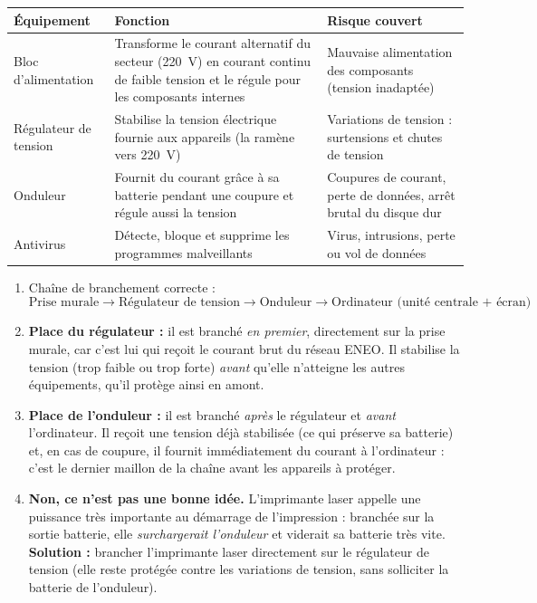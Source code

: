 \documentclass[11pt]{article}
\begin{document}
\begin{corrige}
\begin{center}
\begin{tabularx}{\linewidth}{|l|X|X|}
\hline
\rowcolor{popblueL} \textbf{Équipement} & \textbf{Fonction} & \textbf{Risque couvert} \\
\hline
Bloc d'alimentation & Transforme le courant alternatif du secteur (\SI{220}{V}) en courant continu de faible tension et le régule pour les composants internes & Mauvaise alimentation des composants (tension inadaptée) \\
\hline
Régulateur de tension & Stabilise la tension électrique fournie aux appareils (la ramène vers \SI{220}{V}) & Variations de tension : surtensions et chutes de tension \\
\hline
Onduleur & Fournit du courant grâce à sa batterie pendant une coupure et régule aussi la tension & Coupures de courant, perte de données, arrêt brutal du disque dur \\
\hline
Antivirus & Détecte, bloque et supprime les programmes malveillants & Virus, intrusions, perte ou vol de données \\
\hline
\end{tabularx}
\end{center}
\end{corrige}

\begin{corrige}
\begin{enumerate}
\item Chaîne de branchement correcte :
\[ \text{Prise murale} \rightarrow \text{Régulateur de tension} \rightarrow \text{Onduleur} \rightarrow \text{Ordinateur (unité centrale + écran)} \]
\item \textbf{Place du régulateur :} il est branché \emph{en premier}, directement sur la prise murale, car c'est lui qui reçoit le courant brut du réseau ENEO. Il stabilise la tension (trop faible ou trop forte) \emph{avant} qu'elle n'atteigne les autres équipements, qu'il protège ainsi en amont.
\item \textbf{Place de l'onduleur :} il est branché \emph{après} le régulateur et \emph{avant} l'ordinateur. Il reçoit une tension déjà stabilisée (ce qui préserve sa batterie) et, en cas de coupure, il fournit immédiatement du courant à l'ordinateur : c'est le dernier maillon de la chaîne avant les appareils à protéger.
\item \textbf{Non, ce n'est pas une bonne idée.} L'imprimante laser appelle une puissance très importante au démarrage de l'impression : branchée sur la sortie batterie, elle \emph{surchargerait l'onduleur} et viderait sa batterie très vite. \textbf{Solution :} brancher l'imprimante laser directement sur le régulateur de tension (elle reste protégée contre les variations de tension, sans solliciter la batterie de l'onduleur).
\end{enumerate}
\end{corrige}
\end{document}
